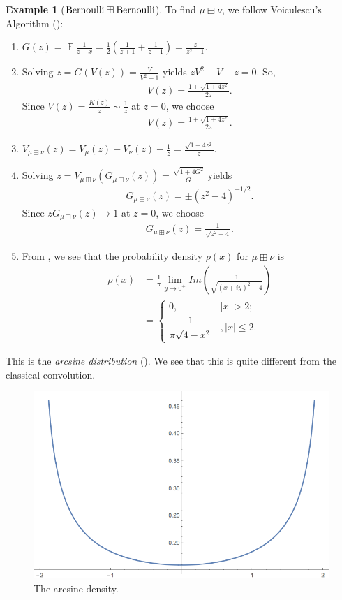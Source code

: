 \documentclass[letterpaper,11pt,oneside,reqno]{amsart}
\numberwithin{equation}{section}
\DeclareMathOperator{\EE}{\mathbb{E}}
\theoremstyle{definition}
\newtheorem{example}[proposition]{Example}
\begin{document}
\begin{example}[$\textnormal{Bernoulli}\boxplus \textnormal{Bernoulli}$]
To find $\mu\boxplus\nu$, we follow Voiculescu's Algorithm ():
\begin{enumerate}
    \item $\displaystyle G(z)=\EE\frac{1}{z-x}=\frac{1}{2}\left(\frac{1}{z+1}+\frac{1}{z-1}\right)=\frac{z}{z^2-1}$.
    \item Solving $\displaystyle z=G(V(z))=\frac{V}{V^2-1}$ yields $zV^2-V-z=0$. So, 
    \begin{align*}
        V(z)=\frac{1\pm\sqrt{1+4z^2}}{2z}.
    \end{align*}
    Since $V(z)=\frac{K(z)}{z}\sim \frac{1}{z}$ at $z=0$, we choose
    \begin{align*}
        V(z)=\frac{1+\sqrt{1+4z^2}}{2z}.
    \end{align*}
    \item $\displaystyle V_{\mu\boxplus\nu}(z)=V_{\mu}(z)+V_{\nu}(z)-\frac{1}{z}=\frac{\sqrt{1+4z^2}}{z}$.
    \item Solving $\displaystyle z=V_{\mu\boxplus\nu}(G_{\mu\boxplus\nu}(z))=\frac{\sqrt{1+4G^2}}{G}$ yields 
    \begin{align*}
        G_{\mu\boxplus\nu}(z)=\pm (z^2-4)^{-1/2}.
    \end{align*}
    Since $zG_{\mu\boxplus\nu}(z)\to 1$ at $z=0$, we choose
    \begin{align*}
        G_{\mu\boxplus\nu}(z)=\frac{1}{\sqrt{z^2-4}}.
    \end{align*}
    \item From , we see that the probability density $\rho(x)$ for $\mu\boxplus\nu$ is 
    \begin{align*}
        \rho(x)&=\frac1\pi\lim_{y\to 0^+}Im\left(\frac{1}{\sqrt{(x+iy)^2-4}}\right)\\
        &=
        \begin{cases}
        	0,&|x|>2;\\
        	\dfrac{1}{\pi\sqrt{4-x^2}} &, |x|\leq 2.
        \end{cases}
    \end{align*}
\end{enumerate}
This is the \emph{arcsine distribution} (). We see that this is quite different from the classical convolution. 
\end{example}
\begin{figure}[htbp]
	\includegraphics[width=.6\textwidth]{img/arcsine.png}
	\caption{The arcsine density.}
	\label{fig:arcsine}
\end{figure}
\end{document}
